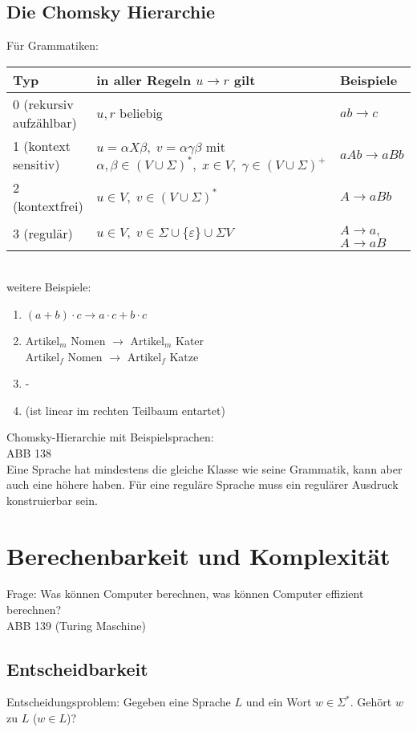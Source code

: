 \section{Die Chomsky Hierarchie}
Für Grammatiken:\\
\begin{tabular}{L{0.3} L{0.5} L{0.2}}
Typ & in aller Regeln $u\to r$ gilt & Beispiele\\
 (rekursiv aufzählbar) & $u,r$ beliebig & $ab\to c$\\
1 (kontext sensitiv) & $u=\alpha X \beta, \; v = \alpha \gamma \beta$ mit $\alpha, \beta \in (V\cup \Sigma)^*, \; x \in V, \; \gamma \in (V\cup \Sigma)^+$ & $aAb \to aBb$\\
2 (kontextfrei) & $u \in V, \; v\in (V \cup \Sigma)^*$ & $A \to aBb$\\
3 (regulär) & $u\in V, \; v \in \Sigma \cup \{\varepsilon\} \cup \Sigma V$ & $A \to a$, $A\to aB$
\end{tabular}\\
weitere Beispiele:
\begin{enumerate}[start=0]
\item $(a+b) \cdot c \to a\cdot c + b \cdot c$
\item Artikel$_m$ Nomen $\to$ Artikel$_m$ Kater\\
Artikel$_f$ Nomen $\to$ Artikel$_f$ Katze
\item - 
\item (ist linear im rechten Teilbaum entartet)
\end{enumerate}
Chomsky-Hierarchie mit Beispielsprachen:\\
ABB 138\\
Eine Sprache hat mindestens die gleiche Klasse wie seine Grammatik, kann aber auch eine höhere haben. Für eine reguläre Sprache muss ein regulärer Ausdruck konstruierbar sein.
\chapter{Berechenbarkeit und Komplexität}
Frage: Was können Computer berechnen, was können Computer effizient berechnen?\\
ABB 139 (Turing Maschine)
\section{Entscheidbarkeit}
Entscheidungsproblem: Gegeben eine Sprache $L$ und ein Wort $w\in \Sigma^*$. Gehört $w$ zu $L$ ($w\in L$)?

